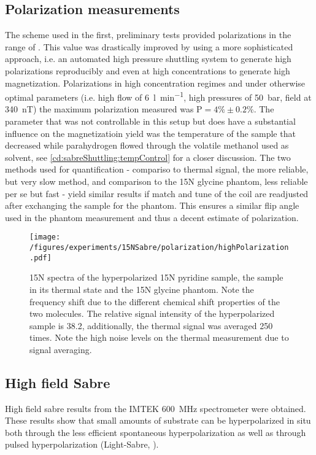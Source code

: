     \subsection{Polarization measurements}
        The scheme used in the first, preliminary tests provided polarizations in the range of . This value was drastically improved by using a more sophisticated approach, i.e. an automated high pressure shuttling system to generate high polarizations reproducibly and even at high concentrations to generate high magnetization.
    Polarizations in high concentration regimes and under otherwise optimal parameters (i.e. high flow of \SI{6}{\litre\per\minute}, high pressures of \SI{50}{\bar}, field at \SI{340}{\nano\tesla}) the maximum polarization measured was $\mathrm{P} = 4\% \pm 0.2 \%$. The parameter that was not controllable in this setup but does have a substantial influence on the magnetizatioin yield was the temperature of the sample that decreased while parahydrogen flowed through the volatile methanol used as solvent, see \ref{cd:sabreShuttling:tempControl} for a closer discussion.
        The two methods used for quantification - compariso to thermal signal, the more reliable, but very slow method, and comparison to the 15N glycine phantom, less reliable per se but fast - yield similar results if match and tune of the coil are readjusted after exchanging the sample for the phantom. This ensures a similar flip angle used in the phantom measurement and thus a decent estimate of polarization.
        \begin{figure}
            \label{fig:results:15N:polarization}
            \texttt{[image: /figures/experiments/15NSabre/polarization/highPolarization.pdf]}
            \caption[High 15N polarization]{15N spectra of the hyperpolarized 15N pyridine sample, the sample in its thermal state and the 15N glycine phantom. Note the frequency shift due to the different chemical shift properties of the two molecules. The relative signal intensity of the hyperpolarized sample is 38.2, additionally, the thermal signal was averaged 250 times. Note the high noise levels on the thermal measurement due to signal averaging.}
        \end{figure}
    \subsection{High field Sabre}
        High field sabre results from the IMTEK \SI{600}{\mega\hertz} spectrometer were obtained. These results show that small amounts of substrate can be hyperpolarized in situ both through the less efficient spontaneous hyperpolarization as well as through pulsed hyperpolarization (Light-Sabre, ).
